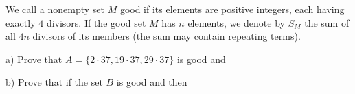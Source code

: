 We call a nonempty set $M$ good if its elements are positive integers, each
having exactly $4$ divisors. If the good set $M$ has $n$ elements, we denote by
$S_{M}$ the sum of all $4n$ divisors of its members (the sum may contain
repeating terms).

a) Prove that $A=\{2\cdot37,19\cdot37,29\cdot37\}$ is good and 

b) Prove that if the set $B$ is good and  then 